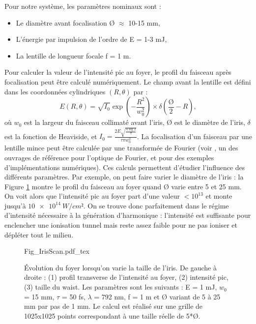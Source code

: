Pour notre système, les paramètres nominaux sont :
\begin{itemize}
\item Le diamètre avant focalisation \O{} $\approx$ 10-15 mm,
\item L'énergie par impulsion de l'ordre de E = 1-3 mJ,
\item La lentille de longueur focale f = 1 m. \\
\end{itemize}
Pour calculer la valeur de l'intensité pic au foyer, le profil du faisceau après focalisation peut être calculé numériquement. Le champ avant la lentille est défini dans les coordonnées cylindriques $(R,\theta)$ par :
\begin{equation*}
E(R,\theta) = \sqrt{I_0} \exp{\left(-\frac{R^2}{w_0^2}\right)}\times\delta(\frac{\mbox{\O}}{2}-R),
\end{equation*}
où $w_0$ est la largeur du faisceau collimaté avant l'iris, \O{}  est le diamètre de l'iris, $\delta$ est la fonction de Heaviside, et $I_0 = \frac{2E\sqrt{\frac{4\log{2}}{\pi}}}{\tau\pi w_0^2}$.
La focalisation d'un faisceau par une lentille mince peut être calculée par une transformée de Fourier (voir , un des ouvrages de référence pour l'optique de Fourier, et  pour des exemples d'implémentations numériques). Ces calculs permettent d'étudier l'influence des différents paramètres. Par exemple, on peut faire varier le diamètre de l'iris : la Figure \ref{Fig:IrisScan} montre le profil du faisceau au foyer quand \O{} varie entre 5 et 25 mm. On voit alors que l'intensité pic au foyer part d'une valeur $<10^{13}$ et monte jusqu'à $\SI{10e14}{W/cm²}$. On se trouve donc parfaitement dans le régime d'intensité nécessaire à la génération d'harmonique : l'intensité est suffisante pour enclencher une ionisation tunnel mais reste assez faible pour ne pas ioniser et dépléter tout le milieu.

\begin{figure}[!ht]
\centering
\def\svgwidth{\columnwidth}
{Fig_IrisScan.pdf_tex}
\caption{\'{E}volution du foyer lorsqu'on varie la taille de l'iris. De gauche à droite : (1) profil transverse de l'intensité au foyer, (2) intensité pic, (3) taille du waist. Les paramètres sont les suivants : E = 1 mJ, $w_0$ = 15 mm, $\tau$ = 50 fs, $\lambda$ = 792 nm, f = 1 m et \O{} variant de 5 à 25 mm par pas de 1 mm. Le calcul est réalisé sur une grille de 1025x1025 points correspondant à une taille réelle de 5*\O{}.}
\label{Fig:IrisScan}
\end{figure}

